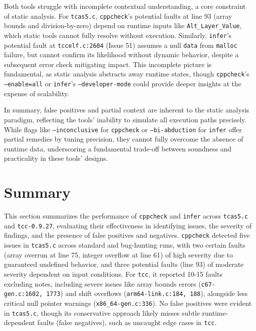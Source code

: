 \documentclass[conference]{IEEEtran}
\begin{document}
Both tools struggle with incomplete contextual understanding, a core constraint of static analysis. For \texttt{tcas5.c}, \texttt{cppcheck}’s potential faults at line 93 (array bounds and division-by-zero) depend on runtime inputs like \texttt{Alt\_Layer\_Value}, which static tools cannot fully resolve without execution. Similarly, \texttt{infer}’s potential fault at \texttt{tccelf.c:2604} (Issue 51) assumes a null \texttt{data} from \texttt{malloc} failure, but cannot confirm its likelihood without dynamic behavior, despite a subsequent error check mitigating impact. This incomplete picture is fundamental, as static analysis abstracts away runtime states, though \texttt{cppcheck}’s \texttt{--enable=all} or \texttt{infer}’s \texttt{--developer-mode} could provide deeper insights at the expense of scalability.

In summary, false positives and partial context are inherent to the static analysis paradigm, reflecting the tools’ inability to simulate all execution paths precisely. While flags like \texttt{--inconclusive} for \texttt{cppcheck} or \texttt{--bi-abduction} for \texttt{infer} offer partial remedies by tuning precision, they cannot fully overcome the absence of runtime data, underscoring a fundamental trade-off between soundness and practicality in these tools’ designs.

\section{Summary}
This section summarizes the performance of \texttt{cppcheck} and \texttt{infer} across \texttt{tcas5.c} and \texttt{tcc-0.9.27}, evaluating their effectiveness in identifying issues, the severity of findings, and the presence of false positives and negatives. \texttt{cppcheck} detected five issues in \texttt{tcas5.c} across standard and bug-hunting runs, with two certain faults (array overrun at line 75, integer overflow at line 61) of high severity due to guaranteed undefined behavior, and three potential faults (line 93) of moderate severity dependent on input conditions. For \texttt{tcc}, it reported 10-15 faults excluding notes, including severe issues like array bounds errors (\texttt{c67-gen.c:1602, 1773}) and shift overflows (\texttt{arm64-link.c:184, 188}), alongside less critical null pointer warnings (\texttt{x86\_64-gen.c:336}). No false positives were evident in \texttt{tcas5.c}, though its conservative approach likely misses subtle runtime-dependent faults (false negatives), such as uncaught edge cases in \texttt{tcc}.
\end{document}
